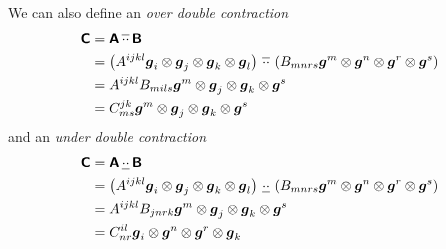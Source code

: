 We can also define an \emph{over double contraction} \ie
\begin{equation}
  \begin{aligned}
    \boldsymbol{\mathsf{C}}
    &= \boldsymbol{\mathsf{A}} \, \overline{\cdot\cdot} \, \boldsymbol{\mathsf{B}} \\
    &= \left( A^{ijkl}  \boldsymbol{g} _{i} \otimes  \boldsymbol{g} _{j} \otimes  \boldsymbol{g} _{k} \otimes  \boldsymbol{g} _{l}  \right) \, \overline{\cdot\cdot} \, \left( B_{mnrs}  \boldsymbol{g} ^{m} \otimes  \boldsymbol{g} ^{n} \otimes  \boldsymbol{g} ^{r} \otimes  \boldsymbol{g} ^{s}  \right) \\
    &=A^{ijkl}B_{mils}  \boldsymbol{g} ^{m} \otimes  \boldsymbol{g} _{j} \otimes  \boldsymbol{g} _{k} \otimes  \boldsymbol{g} ^{s} \\
    &=C^{jk}_{ms}  \boldsymbol{g} ^{m} \otimes  \boldsymbol{g} _{j} \otimes  \boldsymbol{g} _{k} \otimes  \boldsymbol{g} ^{s} 
  \end{aligned}
\end{equation}
and an \emph{under double contraction} \ie
\begin{equation}
  \begin{aligned}
    \boldsymbol{\mathsf{C}}
    &= \boldsymbol{\mathsf{A}} \, \underline{\cdot\cdot} \, \boldsymbol{\mathsf{B}} \\
    &= \left( A^{ijkl}  \boldsymbol{g} _{i} \otimes  \boldsymbol{g} _{j} \otimes  \boldsymbol{g} _{k} \otimes  \boldsymbol{g} _{l}  \right) \, \underline{\cdot\cdot} \, \left( B_{mnrs}  \boldsymbol{g} ^{m} \otimes  \boldsymbol{g} ^{n} \otimes  \boldsymbol{g} ^{r} \otimes  \boldsymbol{g} ^{s}  \right) \\
    &=A^{ijkl}B_{jnrk}  \boldsymbol{g} ^{m} \otimes  \boldsymbol{g} _{j} \otimes  \boldsymbol{g} _{k} \otimes  \boldsymbol{g} ^{s} \\
    &=C^{il}_{nr}  \boldsymbol{g} _{i} \otimes  \boldsymbol{g} ^{n} \otimes  \boldsymbol{g} ^{r} \otimes  \boldsymbol{g} _{k} 
  \end{aligned}
\end{equation}

